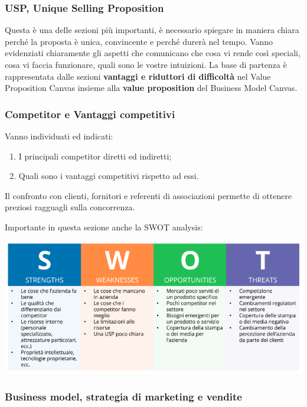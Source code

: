 \documentclass[14pt]{extarticle}
\begin{document}
\subsubsection{USP, Unique Selling Proposition}

Questa è una delle sezioni più importanti, è necessario spiegare in maniera
chiara perché la proposta è unica, convincente e perché durerà nel tempo. Vanno
evidenziati chiaramente gli aspetti che comunicano che cosa vi rende così
speciali, cosa vi faccia funzionare, quali sono le vostre intuizioni. La base di
partenza è rappresentata dalle sezioni \textbf{vantaggi e riduttori di
difficoltà} nel Value Proposition Canvas insieme alla \textbf{value proposition}
del Business Model Canvas.

\newpage
\subsubsection{Competitor e Vantaggi competitivi}

Vanno individuati ed indicati:
\begin{enumerate}
    \item I principali competitor diretti ed indiretti;
    \item Quali sono i vantaggi competitivi rispetto ad essi.
\end{enumerate}
Il confronto con clienti, fornitori e referenti di associazioni permette di
ottenere preziosi ragguagli sulla concorrenza.

Importante in questa sezione anche la SWOT analysis:

\begin{center}
    \includegraphics[scale=0.65]{images/SWOT.png}
\end{center}

\subsubsection{Business model, strategia di marketing e vendite}
\end{document}
